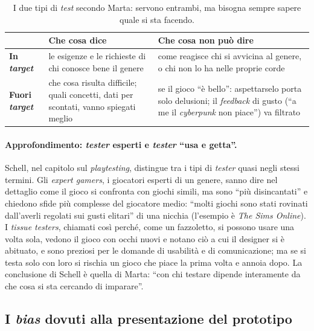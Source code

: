 \begin{table}[htbp]
\centering
\small
\begin{tabular}{@{}p{2.4cm}p{5.3cm}p{5.3cm}@{}}
\toprule
 & \textbf{Che cosa dice} & \textbf{Che cosa non può dire} \\
\midrule
\textbf{In \emph{target}} & le esigenze e le richieste di chi conosce bene il genere &
  come reagisce chi si avvicina al genere, o chi non lo ha nelle proprie corde \\
\addlinespace
\textbf{Fuori \emph{target}} & che cosa risulta difficile; quali concetti, dati per
  scontati, vanno spiegati meglio & se il gioco ``è bello'': aspettarselo porta solo
  delusioni; il \emph{feedback} di gusto (``a me il \emph{cyberpunk} non piace'') va
  filtrato \\
\bottomrule
\end{tabular}
\caption{I due tipi di \emph{test} secondo Marta: servono entrambi, ma bisogna sempre
sapere quale si sta facendo.}
\label{a13:tab:target}
\end{table}

\paragraph{Approfondimento: \emph{tester} esperti e \emph{tester} ``usa e getta''.} Schell,
nel capitolo sul \emph{playtesting}, distingue tra i tipi di \emph{tester} quasi negli
stessi termini. Gli \emph{expert gamers}, i giocatori esperti di un genere, sanno dire nel
dettaglio come il gioco si confronta con giochi simili, ma sono ``più disincantati'' e
chiedono sfide più complesse del giocatore medio: ``molti giochi sono stati rovinati
dall'averli regolati sui gusti elitari'' di una nicchia (l'esempio è \emph{The Sims
Online}). I \emph{tissue testers}, chiamati così perché, come un fazzoletto, si possono usare
una volta sola, vedono il gioco con occhi nuovi e notano ciò a cui il designer si è
abituato, e sono preziosi per le domande di usabilità e di comunicazione; ma se si testa
solo con loro si rischia un gioco che piace la prima volta e annoia dopo. La conclusione di
Schell è quella di Marta: ``con chi testare dipende interamente da che cosa si sta cercando
di imparare''.

\subsection{I \emph{bias} dovuti alla presentazione del prototipo}

